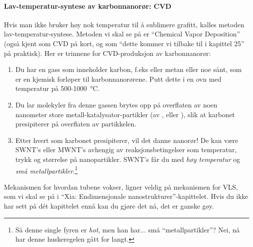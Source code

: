 \paragraph{Lav-temperatur-syntese av karbonnanorør: CVD} Hvis man ikke bruker høy nok temperatur til å sublimere grafitt, kalles metoden lav-temperatur-syntese. Metoden vi skal se på er ``Chemical Vapor Deposition'' (også kjent som CVD på kort, og som ``dette kommer vi tilbake til i kapittel 25'' på praktisk). Her er trinnene for CVD-produksjon av karbonnanorør:
\begin{enumerate}
	\item Du har en gass som inneholder karbon, f.eks  eller metan eller noe sånt, som er en kjemisk forløper til karbonnanorørene. Putt dette i en ovn med temperatur på 500-\SI{1000}{\celsius}.
	\item Du lar molekyler fra denne gassen brytes opp på overflaten av noen nanometer store metall-katalysator-partikler (av ,  eller ), slik at karbonet presipiterer på overflaten av partikkelen.
	\item Etter hvert som karbonet presipiterer, vil det danne nanorør! De kan være SWNT's eller MWNT's avhengig av reaksjonsbetingelser som temperatur, trykk og størrelse på nanopartikler. SWNT's får du med \emph{høy temperatur} og \emph{små metallpartikler}.\footnote{Så denne single fyren er \emph{hot}, men han har... små ``metallpartikler''? Nei, nå har denne huskeregelen gått for langt.}
\end{enumerate}
Mekanismen for hvordan tubene vokser, ligner veldig på mekanismen for VLS, som vi skal se på i ``Xia: Endimensjonale nanostrukturer''-kapittelet. Hvis du ikke har sett på dét kapittelet ennå kan du gjøre det nå, det er ganske gøy.


